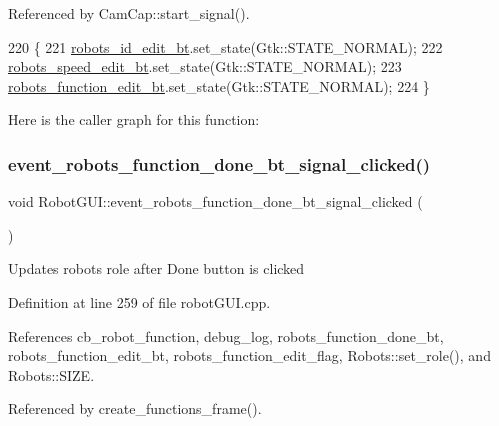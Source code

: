Referenced by Cam\+Cap\+::start\+\_\+signal().


\begin{DoxyCode}
220                               \{
221     \hyperlink{class_robot_g_u_i_aa74c3aa318e937124b6bd8cc1139ffbd}{robots\_id\_edit\_bt}.set\_state(Gtk::STATE\_NORMAL);
222     \hyperlink{class_robot_g_u_i_aeb9008eb20d42d90fe39564179598d6d}{robots\_speed\_edit\_bt}.set\_state(Gtk::STATE\_NORMAL);
223     \hyperlink{class_robot_g_u_i_ac474c7d61bd07aaf26f75acb691e2971}{robots\_function\_edit\_bt}.set\_state(Gtk::STATE\_NORMAL);
224 \}
\end{DoxyCode}
Here is the caller graph for this function\+:
\mbox{\label{class_robot_g_u_i_a772f8b103a92bc866827c5553451120e}} 
\subsubsection{\texorpdfstring{event\+\_\+robots\+\_\+function\+\_\+done\+\_\+bt\+\_\+signal\+\_\+clicked()}{event\_robots\_function\_done\_bt\_signal\_clicked()}}
{\footnotesize\ttfamily void Robot\+G\+U\+I\+::event\+\_\+robots\+\_\+function\+\_\+done\+\_\+bt\+\_\+signal\+\_\+clicked (\begin{DoxyParamCaption}{ }\end{DoxyParamCaption})\hspace{0.3cm}{\ttfamily [private]}}

Updates robot\textquotesingle{}s role after Done button is clicked 

Definition at line 259 of file robot\+G\+U\+I.\+cpp.



References cb\+\_\+robot\+\_\+function, debug\+\_\+log, robots\+\_\+function\+\_\+done\+\_\+bt, robots\+\_\+function\+\_\+edit\+\_\+bt, robots\+\_\+function\+\_\+edit\+\_\+flag, Robots\+::set\+\_\+role(), and Robots\+::\+S\+I\+ZE.



Referenced by create\+\_\+functions\+\_\+frame().


